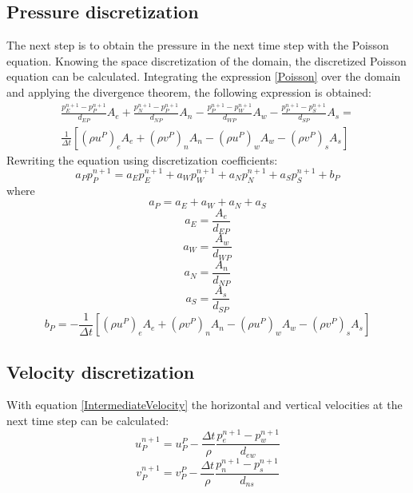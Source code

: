 \subsection{Pressure discretization}
The next step is to obtain the pressure in the next time step with the Poisson equation. Knowing the space discretization of the domain, the discretized Poisson equation can be calculated. Integrating the expression \ref{Poisson} over the domain and applying the divergence theorem, the following expression is obtained:
\begin{equation}
\begin{aligned}
\frac{p_{E}^{n+1}-p_{P}^{n+1}}{d_{EP}}A_{e}+\frac{p_{N}^{n+1}-p_{P}^{n+1}}{d_{NP}}A_{n}-\frac{p_{P}^{n+1}-p_{W}^{n+1}}{d_{WP}}A_{w}-\frac{p_{P}^{n+1}-p_{S}^{n+1}}{d_{SP}}A_{s}= \\
\frac{1}{\Delta t}\left[\left(\rho u^{P}\right)_{e}A_{e}+\left(\rho v^{P}\right)_{n}A_{n}-\left(\rho u^{P}\right)_{w}A_{w}-\left(\rho v^{P}\right)_{s}A_{s}\right]
\end{aligned}
\end{equation}
Rewriting the equation using discretization coefficients:
\begin{equation}
a_{P}p_{P}^{n+1}=a_{E}p_{E}^{n+1}+a_{W}p_{W}^{n+1}+a_{N}p_{N}^{n+1}+a_{S}p_{S}^{n+1}+b_{P}
\end{equation}
where
\begin{equation}
a_{P}=a_{E}+a_{W}+a_{N}+a_{S}
\end{equation}
\begin{equation}
a_{E}=\frac{A_{e}}{d_{EP}}
\end{equation}
\begin{equation}
a_{W}=\frac{A_{w}}{d_{WP}}
\end{equation}
\begin{equation}
a_{N}=\frac{A_{n}}{d_{NP}}
\end{equation}
\begin{equation}
a_{S}=\frac{A_{s}}{d_{SP}}
\end{equation}
\begin{equation}
b_{P}=-\frac{1}{\Delta t}\left[\left(\rho u^{P}\right)_{e}A_{e}+\left(\rho v^{P}\right)_{n}A_{n}-\left(\rho u^{P}\right)_{w}A_{w}-\left(\rho v^{P}\right)_{s}A_{s}\right]
\end{equation}

\subsection{Velocity discretization}
With equation \ref{IntermediateVelocity} the horizontal and vertical velocities at the next time step can be calculated:
\begin{equation}
u_{P}^{n+1}=u_{P}^{P}-\frac{\Delta t}{\rho}\frac{p_{e}^{n+1}-p_{w}^{n+1}}{d_{ew}}
\end{equation}
\begin{equation}
v_{P}^{n+1}=v_{P}^{P}-\frac{\Delta t}{\rho}\frac{p_{n}^{n+1}-p_{s}^{n+1}}{d_{ns}}
\end{equation}

